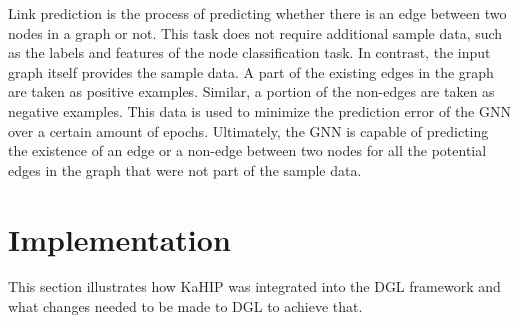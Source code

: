 \documentclass[acmsmall,nonacm,screen,review]{acmart}
\begin{document}
Link prediction is the process of predicting whether there is an edge between two nodes in a graph or not. This task does not require additional sample data, such as the labels and features of the node classification task. In contrast, the input graph itself provides the sample data. A part of the existing edges in the graph are taken as positive examples. Similar, a portion of the non-edges are taken as negative examples. This data is used to minimize the prediction error of the GNN over a certain amount of epochs. Ultimately, the GNN is capable of predicting the existence of an edge or a non-edge between two nodes for all the potential edges in the graph that were not part of the sample data.
\section{Implementation}

This section illustrates how KaHIP was integrated into the DGL framework and what changes needed to be made to DGL to achieve that.
\end{document}

